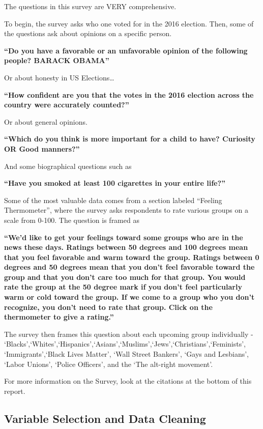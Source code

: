 \documentclass[
]{article}
\begin{document}
The questions in this survey are VERY comprehensive.

To begin, the survey asks who one voted for in the 2016 election. Then,
some of the questions ask about opinions on a specific person.

\textbf{``Do you have a favorable or an unfavorable opinion of the
following people? BARACK OBAMA''}

Or about honesty in US Elections\ldots{}

\textbf{``How confident are you that the votes in the 2016 election
across the country were accurately counted?''}

Or about general opinions.

\textbf{``Which do you think is more important for a child to have?
Curiosity OR Good manners?''}

And some biographical questions such as

\textbf{``Have you smoked at least 100 cigarettes in your entire
life?''}

Some of the most valuable data comes from a section labeled ``Feeling
Thermometer'', where the survey asks respondents to rate various groups
on a scale from 0-100. The question is framed as

\textbf{``We'd like to get your feelings toward some groups who are in
the news these days. Ratings between 50 degrees and 100 degrees mean
that you feel favorable and warm toward the group. Ratings between 0
degrees and 50 degrees mean that you don't feel favorable toward the
group and that you don't care too much for that group. You would rate
the group at the 50 degree mark if you don't feel particularly warm or
cold toward the group. If we come to a group who you don't recognize,
you don't need to rate that group. Click on the thermometer to give a
rating.''}

The survey then frames this question about each upcoming group
individually -
`Blacks',`Whites',`Hispanics',`Asians',`Muslims',`Jews',`Christians',`Feminists',
`Immigrants',`Black Lives Matter', `Wall Street Bankers', `Gays and
Lesbians', `Labor Unions', `Police Officers', and the `The alt-right
movement'.

For more information on the Survey, look at the citations at the bottom
of this report.

\hypertarget{variable-selection-and-data-cleaning}{%
\subsection{Variable Selection and Data
Cleaning}\label{variable-selection-and-data-cleaning}}
\end{document}
